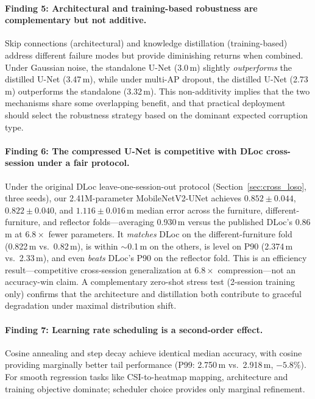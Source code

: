 \documentclass[11pt,a4paper]{article}
\begin{document}
\paragraph{Finding 5: Architectural and training-based robustness are complementary but not additive.}
Skip connections (architectural) and knowledge distillation (training-based) address different failure modes but provide diminishing returns when combined.
Under Gaussian noise, the standalone U-Net (3.0\,m) slightly \emph{outperforms} the distilled U-Net (3.47\,m), while under multi-AP dropout, the distilled U-Net (2.73\,m) outperforms the standalone (3.32\,m).
This non-additivity implies that the two mechanisms share some overlapping benefit, and that practical deployment should select the robustness strategy based on the dominant expected corruption type.

\paragraph{Finding 6: The compressed U-Net is competitive with DLoc cross-session under a fair protocol.}
Under the original DLoc leave-one-session-out protocol (Section~\ref{sec:cross_loso}, three seeds), our 2.41M-parameter MobileNetV2-UNet achieves $0.852 \pm 0.044$, $0.822 \pm 0.040$, and $1.116 \pm 0.016$\,m median error across the furniture, different-furniture, and reflector folds---averaging 0.930\,m versus the published DLoc's 0.86\,m at $6.8\times$ fewer parameters.
It \emph{matches} DLoc on the different-furniture fold (0.822\,m vs.\ 0.82\,m), is within $\sim$0.1\,m on the others, is level on P90 (2.374\,m vs.\ 2.33\,m), and even \emph{beats} DLoc's P90 on the reflector fold.
This is an efficiency result---competitive cross-session generalization at $6.8\times$ compression---not an accuracy-win claim.
A complementary zero-shot stress test (2-session training only) confirms that the architecture and distillation both contribute to graceful degradation under maximal distribution shift.

\paragraph{Finding 7: Learning rate scheduling is a second-order effect.}
Cosine annealing and step decay achieve identical median accuracy, with cosine providing marginally better tail performance (P99: 2.750\,m vs.\ 2.918\,m, $-5.8\%$).
For smooth regression tasks like CSI-to-heatmap mapping, architecture and training objective dominate; scheduler choice provides only marginal refinement.
\end{document}
